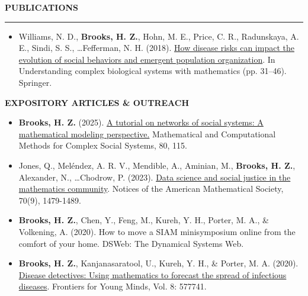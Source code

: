 \documentclass{resume} %
\renewenvironment{rSection}[1]{
\sectionskip
\textcolor{WinePurple}{\MakeUppercase{#1}}
\sectionlineskip
\hrule
\begin{list}{}{
\setlength{\leftmargin}{1.5em}
}
\item[]
}{
\end{list}
}
\begin{document}
\begin{rSection}{\bf Publications}
\begin{itemize}
    \item Williams, N. D., {\bf Brooks, H. Z.}, Hohn, M. E., Price, C. R., Radunskaya, A. E., Sindi, S. S., \dots Feﬀerman, N. H. (2018). \href{https://link.springer.com/chapter/10.1007/978-3-319-98083-6_2}{How disease risks can impact the evolution of social behaviors and emergent
    population organization}. In Understanding complex biological systems with mathematics (pp. 31–46).
    Springer.
\end{itemize}

\uppercase{{\bf Expository Articles \& Outreach}}

\begin{itemize}
    \item {\bf Brooks, H. Z.} (2025). \href{https://arxiv.org/pdf/2302.00801}{A tutorial on networks of social systems: A mathematical modeling perspective.} Mathematical and Computational Methods for Complex Social Systems, 80, 115.

    \item Jones, Q., Meléndez, A. R. V., Mendible, A., Aminian, M., {\bf Brooks, H. Z.}, Alexander, N., \dots Chodrow, P.
    (2023). \href{https://arxiv.org/pdf/2303.09282}{Data science and social justice in the mathematics community}. Notices of the American Mathematical Society, 70(9), 1479-1489.

    \item {\bf Brooks, H. Z.}, Chen, Y., Feng, M., Kureh, Y. H., Porter, M. A., \& Volkening, A. (2020). How to move a
    SIAM minisymposium online from the comfort of your home. DSWeb: The Dynamical Systems Web.

    \item {\bf Brooks, H. Z.}, Kanjanasaratool, U., Kureh, Y. H., \& Porter, M. A. (2020). \href{https://www.frontiersin.org/articles/10.3389/frym.2020.577741/pdf}{Disease detectives: Using
    mathematics to forecast the spread of infectious diseases}. Frontiers for Young Minds, Vol. 8: 577741.
\end{itemize}


\end{rSection}
\newpage
\end{document}
